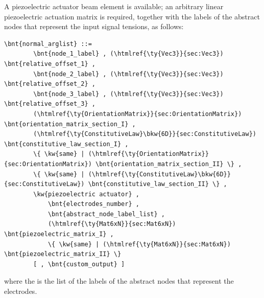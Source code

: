 A piezoelectric actuator beam element is available; an arbitrary
linear piezoelectric actuation matrix is required, together with the labels
of the abstract nodes that represent the input signal tensions, as follows:
\begin{Verbatim}[commandchars=\\\{\}]
    \bnt{normal_arglist} ::=
        \bnt{node_1_label} , (\htmlref{\ty{Vec3}}{sec:Vec3}) \bnt{relative_offset_1} ,
        \bnt{node_2_label} , (\htmlref{\ty{Vec3}}{sec:Vec3}) \bnt{relative_offset_2} ,
        \bnt{node_3_label} , (\htmlref{\ty{Vec3}}{sec:Vec3}) \bnt{relative_offset_3} ,
        (\htmlref{\ty{OrientationMatrix}}{sec:OrientationMatrix}) \bnt{orientation_matrix_section_I} ,
        (\htmlref{\ty{ConstitutiveLaw}\bkw{6D}}{sec:ConstitutiveLaw}) \bnt{constitutive_law_section_I} ,
        \{ \kw{same} | (\htmlref{\ty{OrientationMatrix}}{sec:OrientationMatrix}) \bnt{orientation_matrix_section_II} \} ,
        \{ \kw{same} | (\htmlref{\ty{ConstitutiveLaw}\bkw{6D}}{sec:ConstitutiveLaw}) \bnt{constitutive_law_section_II} \} ,
        \kw{piezoelectric actuator} , 
            \bnt{electrodes_number} ,
            \bnt{abstract_node_label_list} ,
            (\htmlref{\ty{Mat6xN}}{sec:Mat6xN}) \bnt{piezoelectric_matrix_I} ,
            \{ \kw{same} | (\htmlref{\ty{Mat6xN}}{sec:Mat6xN}) \bnt{piezoelectric_matrix_II} \}
        [ , \bnt{custom_output} ]
\end{Verbatim}
where the  is the list of the labels of the
abstract nodes that represent the electrodes.


